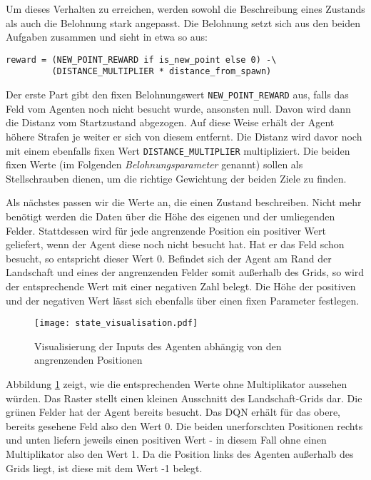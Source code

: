 Um dieses Verhalten zu erreichen, werden sowohl die Beschreibung eines Zustands als auch die Belohnung stark angepasst. Die Belohnung setzt sich aus den beiden Aufgaben zusammen und sieht in etwa so aus:
\begin{verbatim}
reward = (NEW_POINT_REWARD if is_new_point else 0) -\
         (DISTANCE_MULTIPLIER * distance_from_spawn)
\end{verbatim}
Der erste Part gibt den fixen Belohnungswert \texttt{NEW_POINT_REWARD} aus, falls das Feld vom Agenten noch nicht besucht wurde, ansonsten null. Davon wird dann die Distanz vom Startzustand abgezogen. Auf diese Weise erhält der Agent höhere Strafen je weiter er sich von diesem entfernt. Die Distanz wird davor noch mit einem ebenfalls fixen Wert \texttt{DISTANCE_MULTIPLIER} multipliziert. Die beiden fixen Werte (im Folgenden \textit{Belohnungsparameter} genannt) sollen als Stellschrauben dienen, um die richtige Gewichtung der beiden Ziele zu finden.

Als nächstes passen wir die Werte an, die einen Zustand beschreiben. Nicht mehr benötigt werden die Daten über die Höhe des eigenen und der umliegenden Felder. Stattdessen wird für jede angrenzende Position ein positiver Wert geliefert, wenn der Agent diese noch nicht besucht hat. Hat er das Feld schon besucht, so entspricht dieser Wert 0. Befindet sich der Agent am Rand der Landschaft und eines der angrenzenden Felder somit außerhalb des Grids, so wird der entsprechende Wert mit einer negativen Zahl belegt. Die Höhe der positiven und der negativen Wert lässt sich ebenfalls über einen fixen Parameter festlegen.
\begin{figure}[h!]
    \centering
    \texttt{[image: state\_visualisation.pdf]}
    \caption{Visualisierung der Inputs des Agenten abhängig von den angrenzenden Positionen} \label{img:stateVisualisation}
\end{figure}
Abbildung \ref{img:stateVisualisation} zeigt, wie die entsprechenden Werte ohne Multiplikator aussehen würden. Das Raster stellt einen kleinen Ausschnitt des Landschaft-Grids dar. Die grünen Felder hat der Agent bereits besucht. Das DQN erhält für das obere, bereits gesehene Feld also den Wert 0. Die beiden unerforschten Positionen rechts und unten liefern jeweils einen positiven Wert - in diesem Fall ohne einen Multiplikator also den Wert 1. Da die Position links des Agenten außerhalb des Grids liegt, ist diese mit dem Wert -1 belegt.

